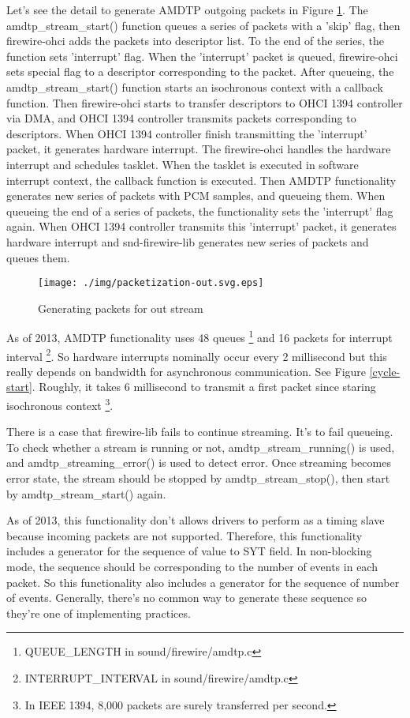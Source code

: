 \documentclass[onecolumn]{article}
\begin{document}
Let's see the detail to generate AMDTP outgoing packets in Figure \ref{fig:packetization-out}. The amdtp\_stream\_start() function queues a series of packets with a 'skip' flag, then firewire-ohci adds the packets into descriptor list. To the end of the series, the function sets 'interrupt' flag. When the 'interrupt' packet is queued, firewire-ohci sets special flag to a descriptor corresponding to the packet. After queueing, the amdtp\_stream\_start() function starts an isochronous context with a callback function. Then firewire-ohci starts to transfer descriptors to OHCI 1394 controller via DMA, and OHCI 1394 controller transmits packets corresponding to descriptors. When OHCI 1394 controller finish transmitting the 'interrupt' packet, it generates hardware interrupt. The firewire-ohci handles the hardware interrupt and schedules tasklet. When the tasklet is executed in software interrupt context, the callback function is executed. Then AMDTP functionality generates new series of packets with PCM samples, and queueing them. When queueing the end of a series of packets, the functionality sets the 'interrupt' flag again. When OHCI 1394 controller transmits this 'interrupt' packet, it generates hardware interrupt and snd-firewire-lib generates new series of packets and queues them.

\begin{figure}[H]
	\centering
	\texttt{[image: ./img/packetization-out.svg.eps]}
	\caption{{Generating packets for out stream}}
	\label{fig:packetization-out}
\end{figure}

As of 2013, AMDTP functionality uses 48 queues \footnote{QUEUE\_LENGTH in sound/firewire/amdtp.c} and 16 packets for interrupt interval \footnote{INTERRUPT\_INTERVAL in sound/firewire/amdtp.c}. So hardware interrupts nominally occur every 2 millisecond but this really depends on bandwidth for asynchronous communication. See Figure \ref{cycle-start}. Roughly, it takes 6 millisecond to transmit a first packet since staring isochronous context \footnote{In IEEE 1394, 8,000 packets are surely transferred per second.}.

There is a case that firewire-lib fails to continue streaming. It's to fail queueing. To check whether a stream is running or not, amdtp\_stream\_running() is used, and amdtp\_streaming\_error() is used to detect error. Once streaming becomes error state, the stream should be stopped by amdtp\_stream\_stop(), then start by amdtp\_stream\_start() again.

As of 2013, this functionality don't allows drivers to perform as a timing slave because incoming packets are not supported. Therefore, this functionality includes a generator for the sequence of value to SYT field. In non-blocking mode, the sequence should be corresponding to the number of events in each packet. So this functionality also includes a generator for the sequence of number of events. Generally, there's no common way to generate these sequence so they're one of implementing practices.
\end{document}
